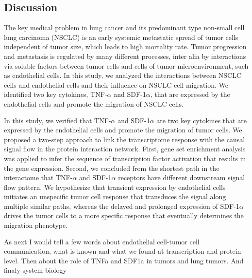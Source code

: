 \subsection{Discussion}

The key medical problem in lung cancer and its predominant type non-small 
cell lung carcinoma (NSCLC) is an early systemic metastatic spread of tumor cells 
independent of tumor size, which leads to high mortality rate. Tumor progression 
and metastasis is regulated by many different processes, inter alia by interactions 
via soluble factors between tumor cells and cells of tumor microenvironment, such as 
endothelial cells. In this study, we analyzed the interactions between NSCLC cells 
and endothelial cells and their influence on NSCLC cell migration. We identified 
two key cytokines, TNF-$\alpha$ and SDF-1$\alpha$, that are expressed by the 
endothelial cells and promote the migration of NSCLC cells.

In this study, we verified that TNF-$\alpha$ and SDF-1$\alpha$ are two
key cytokines that are expressed by the endothelial cells and promote the migration
of tumor cells. We proposed a two-step approach to link the transcriptome response
with the causal signal flow in the protein interaction network. First, gene set
enrichment analysis was applied to infer the sequence of transcription factor
activation that results in the gene expression. Second, we concluded from the 
shortest path in the interactome that 
TNF-$\alpha$ and SDF-1$\alpha$ receptors have different downstream signal flow 
pattern. We hypothesize that transient expression by endothelial cells initiates
an unspecific tumor cell response that transduces the signal along multiple
similar paths, whereas the delayed and prolonged expression of SDF-1$\alpha$ drives
the tumor cells to a more specific response that eventually determines the 
migration phenotype.

As next I would tell a few words about endothelial cell-tumor cell communication, what is known and what we found at transcription and protein level.
Then about the role of TNFa and SDF1a in tumors and lung tumors.
And finaly system biology

